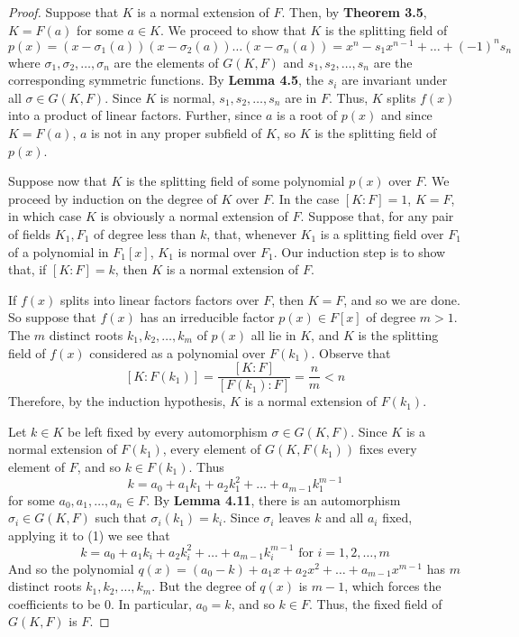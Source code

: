 \documentclass[12pt,leqno]{article}
\numberwithin{equation}{section}
\theoremstyle{plain}
\theoremstyle{definition}
\theoremstyle{remark}
\begin{document}
\begin{proof}
 Suppose that $K$ is a normal extension of $F$. Then, by \textbf{Theorem 3.5}, $K=F(a)$ for some $a\in K$. We proceed to show that $K$ is the splitting field of \[p(x)=(x-\sigma_1(a))(x-\sigma_2(a))\hdots(x-\sigma_n(a))=x^n-s_1x^{n-1}+\hdots+(-1)^ns_n\] where $\sigma_1,\sigma_2,\hdots,\sigma_n$ are the elements of $G(K,F)$ and $s_1,s_2,\hdots,s_n$ are the corresponding symmetric functions. By \textbf{Lemma 4.5}, the $s_i$ are invariant under all $\sigma\in G(K,F)$. Since $K$ is normal, $s_1,s_2,\hdots,s_n$ are in $F$. Thus, $K$ splits $f(x)$ into a product of linear factors. Further, since $a$ is a root of $p(x)$ and since $K=F(a)$, $a$ is not in any proper subfield of $K$, so $K$ is the splitting field of $p(x)$.

Suppose now that $K$ is the splitting field of some polynomial $p(x)$ over $F$. We proceed by induction on the degree of $K$ over $F$. In the case $[K:F]=1$, $K=F$, in which case $K$ is obviously a normal extension of $F$. Suppose that, for any pair of fields $K_1,F_1$ of degree less than $k$, that, whenever $K_1$ is a splitting field over $F_1$ of a polynomial in $F_1[x]$, $K_1$ is normal over $F_1$. Our induction step is to show that, if $[K:F]=k$, then $K$ is a normal extension of $F$.

If $f(x)$ splits into linear factors factors over $F$, then $K=F$, and so we are done. So suppose that $f(x)$ has an irreducible factor $p(x)\in F[x]$ of degree $m>1$. The $m$ distinct roots $k_1,k_2,\hdots,k_m$ of $p(x)$ all lie in $K$, and $K$ is the splitting field of $f(x)$ considered as a polynomial over $F(k_1)$. Observe that \[[K:F(k_1)]=\frac{[K:F]}{[F(k_1):F]}=\frac{n}{m}<n\] Therefore, by the induction hypothesis, $K$ is a normal extension of $F(k_1)$.

Let $k\in K$ be left fixed by every automorphism $\sigma\in G(K,F)$. Since $K$ is a normal extension of $F(k_1)$, every element of $G(K,F(k_1))$ fixes every element of $F$, and so $k\in F(k_1)$. Thus \[\tag{1}k=a_0+a_1k_1+a_2k_1^2+\hdots+a_{m-1}k_1^{m-1}\] for some $a_0,a_1,\hdots,a_n\in F$. By \textbf{Lemma 4.11}, there is an automorphism $\sigma_i\in G(K,F)$ such that $\sigma_i(k_1)=k_i$. Since $\sigma_i$ leaves $k$ and all $a_i$ fixed, applying it to (1) we see that \[\tag{2}k=a_0+a_1k_i+a_2k_i^2+\hdots+a_{m-1}k_i^{m-1}\text{ for }i=1,2,\hdots,m\] And so the polynomial $q(x)=(a_0-k)+a_1x+a_2x^2+\hdots+a_{m-1}x^{m-1}$ has $m$ distinct roots $k_1,k_2,\hdots,k_m$. But the degree of $q(x)$ is $m-1$, which forces the coefficients to be 0. In particular, $a_0=k$, and so $k\in F$. Thus, the fixed field of $G(K,F)$ is $F$.
\end{proof}
\end{document}
